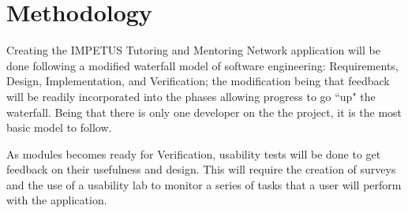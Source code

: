 \documentclass[11pt,letterpaper]{article}
\begin{document}
\section{Methodology}

\begin{doublespacing}

Creating the IMPETUS Tutoring and Mentoring Network application will be done following a modified waterfall model of software engineering: Requirements, Design, Implementation, and Verification; the modification being that feedback will be readily incorporated into the phases allowing progress to go ``up" the waterfall. Being that there is only one developer on the the project, it is the most basic model to follow.

As modules becomes ready for Verification, usability tests will be done to get feedback on their usefulness and design. This will require the creation of surveys and the use of a usability lab to monitor a series of tasks that a user will perform with the application.

\end{doublespacing}

\singlespacing
\raggedright


\end{document}

